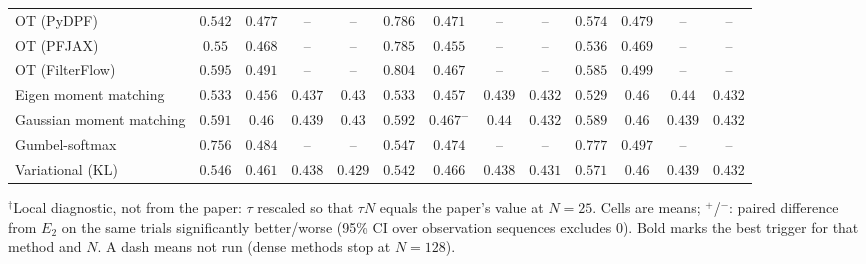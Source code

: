 \begin{table}[ht]
\begin{adjustbox}{max width=\linewidth}
\begin{tabular}{lcccc|cccc|cccc}
OT (PyDPF) & $\mathbf{0.542}$ & $0.477$ & -- & -- & $0.786$ & $\mathbf{0.471}$ & -- & -- & $0.574$ & $0.479$ & -- & -- \\
OT (PFJAX) & $0.55$ & $0.468$ & -- & -- & $0.785$ & $\mathbf{0.455}$ & -- & -- & $\mathbf{0.536}$ & $0.469$ & -- & -- \\
OT (FilterFlow) & $0.595$ & $0.491$ & -- & -- & $0.804$ & $\mathbf{0.467}$ & -- & -- & $\mathbf{0.585}$ & $0.499$ & -- & -- \\
Eigen moment matching & $0.533$ & $\mathbf{0.456}$ & $\mathbf{0.437}$ & $\mathbf{0.43}$ & $0.533$ & $0.457$ & $0.439$ & $0.432$ & $\mathbf{0.529}$ & $0.46$ & $0.44$ & $0.432$ \\
Gaussian moment matching & $0.591$ & $\mathbf{0.46}$ & $0.439$ & $\mathbf{0.43}$ & $0.592$ & $0.467^{-}$ & $0.44$ & $0.432$ & $\mathbf{0.589}$ & $0.46$ & $\mathbf{0.439}$ & $0.432$ \\
Gumbel-softmax & $0.756$ & $0.484$ & -- & -- & $\mathbf{0.547}$ & $\mathbf{0.474}$ & -- & -- & $0.777$ & $0.497$ & -- & -- \\
Variational (KL) & $0.546$ & $0.461$ & $0.438$ & $\mathbf{0.429}$ & $\mathbf{0.542}$ & $0.466$ & $\mathbf{0.438}$ & $0.431$ & $0.571$ & $\mathbf{0.46}$ & $0.439$ & $0.432$ \\
\bottomrule
\end{tabular}
\end{adjustbox}
\par\smallskip\parbox{0.95\linewidth}{\footnotesize $^\dagger$Local diagnostic, not from the paper: $\tau$ rescaled so that $\tau N$ equals the paper's value at $N{=}25$. Cells are means; $^{+}$/$^{-}$: paired difference from $E_2$ on the same trials significantly better/worse (95\% CI over observation sequences excludes 0). Bold marks the best trigger for that method and $N$. A dash means not run (dense methods stop at $N{=}128$).}
\end{table}

